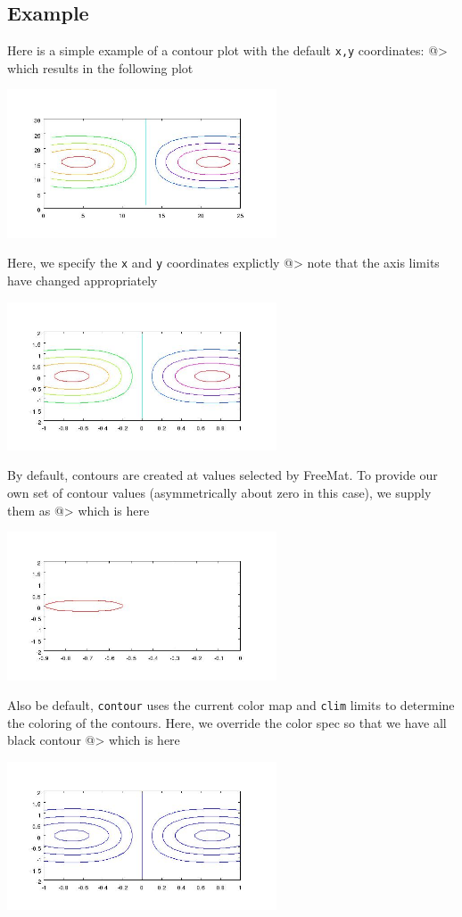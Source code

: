 \subsection{Example}

Here is a simple example of a contour plot with the default \verb|x,y|
coordinates:
@>
which results in the following plot


\centerline{\includegraphics[width=8cm]{contour1}}

Here, we specify the \verb|x| and \verb|y| coordinates explictly
@>
note that the axis limits have changed appropriately


\centerline{\includegraphics[width=8cm]{contour2}}

By default, contours are created at values selected by FreeMat.  To
provide our own set of contour values (asymmetrically about zero in this
case), we supply them as
@>
which is here


\centerline{\includegraphics[width=8cm]{contour3}}

Also be default, \verb|contour| uses the current color map and \verb|clim|
limits to determine the coloring of the contours.  Here, we override the
color spec so that we have all black contour
@>
which is here


\centerline{\includegraphics[width=8cm]{contour4}}

